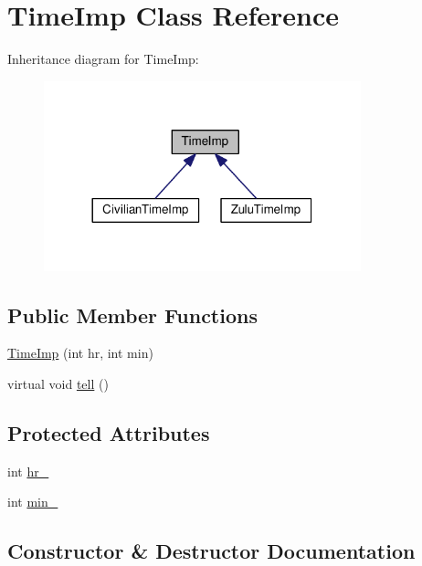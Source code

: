 \hypertarget{classTimeImp}{}\section{Time\+Imp Class Reference}
\label{classTimeImp}


Inheritance diagram for Time\+Imp\+:
\nopagebreak
\begin{figure}[H]
\begin{center}
\leavevmode
\includegraphics[width=260pt]{classTimeImp__inherit__graph}
\end{center}
\end{figure}
\subsection*{Public Member Functions}
\begin{DoxyCompactItemize}
\item 
\hyperlink{classTimeImp_a816d73822130c581b048e223bc0d673f}{Time\+Imp} (int hr, int min)
\item 
virtual void \hyperlink{classTimeImp_a266929eda5b78be282a9872b7785557b}{tell} ()
\end{DoxyCompactItemize}
\subsection*{Protected Attributes}
\begin{DoxyCompactItemize}
\item 
int \hyperlink{classTimeImp_aa4d75bb67cdab3e797171e78996ac551}{hr\+\_\+}
\item 
int \hyperlink{classTimeImp_a72b908ae45367b24517a769ec9bb613f}{min\+\_\+}
\end{DoxyCompactItemize}


\subsection{Constructor \& Destructor Documentation}
